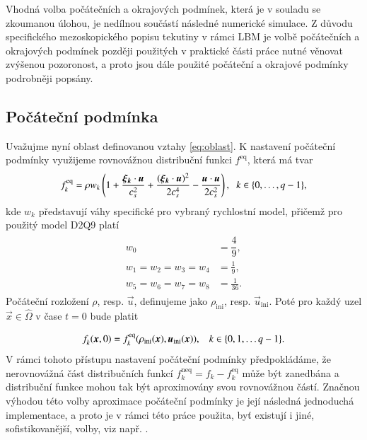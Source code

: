 Vhodná volba počátečních a okrajových podmínek, která je v souladu se zkoumanou úlohou, je nedílnou součástí následné numerické simulace. Z důvodu specifického mezoskopického popisu tekutiny v rámci LBM je volbě počátečních a okrajových podmínek později použitých v praktické části práce nutné věnovat zvýšenou pozoronost, a proto jsou dále použité počáteční a okrajové podmínky podrobněji popsány.

\subsection{Počáteční podmínka}\label{pocatecni podminka}
Uvažujme nyní oblast definovanou vztahy \eqref{eq:oblast}. K nastavení počáteční podmínky využijeme rovnovážnou distribuční funkci $ f^{\mathrm{eq}} $, která má tvar 
\begin{equation}\label{eq:feq}
f^{\mathrm{eq}}_{k} = \rho w_{k} \, \Bigg(1 + \frac{\vec{\xi_{k}} \cdot \vec{u}}{c^{2}_{s}} + \frac{(\vec{\xi_{k}} \cdot \vec{u})^2}{2c^{4}_{s}} - \frac{\vec{u} \cdot \vec{u}}{2c^{2}_{s}} \Bigg)\, , \hspace{2mm} k \in \{0,\dots,q-1\},
\end{equation}
kde $ w_{k} $ představují váhy specifické pro vybraný rychlostní model, přičemž pro použitý model D2Q9 platí~\cite{Kruger}
\begin{align}\label{weighs}
\begin{split}
w_{0} &  = \dfrac{4}{9},\\[4pt]
w_{1} = w_{2} = w_{3} = w_{4} & = \frac{1}{9},\\[4pt]
w_{5} = w_{6} = w_{7} = w_{8} & = \frac{1}{36}.
\end{split}
\end{align}
Počáteční rozložení $ \rho $, resp. $ \vec{u} $, definujeme jako $ \rho _{\mathrm{ini}} $, resp. $ \vec{u} _{\mathrm{ini}} $. Poté pro každý uzel $ \vec{x} \in \hat{\Omega} $ v čase $ t=0 $ bude platit

\begin{equation}\label{eq:initial condition}
f^{}_{k} (\vec{x}, 0) = f^{\mathrm{eq}}_{k} (\rho _{\mathrm{ini}} (\vec{x}), \vec{u} _{\mathrm{ini}} (\vec{x})), \hspace{3mm} k \in \{0, 1, \dots q-1\}.
\end{equation}
V rámci tohoto přístupu nastavení počáteční podmínky předpokládáme, že nerovnovážná část distribučních funkcí $ f^{\mathrm{neq}}_{k} = f_{k} - f^{\mathrm{eq}}_{k}$ může být zanedbána a distribuční funkce mohou tak být aproximovány svou rovnovážnou částí. Značnou výhodou této volby aproximace počáteční podmínky je její následná jednoduchá implementace, a proto je v rámci této práce použita, byť existují i jiné, sofistikovanější, volby, viz např. \cite{PE}.

